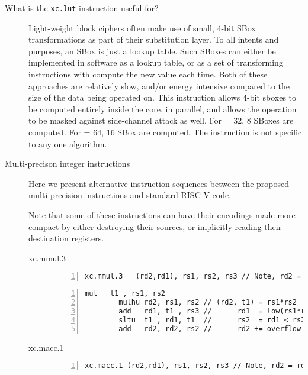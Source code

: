 \begin{description}
\item[What is the {\tt xc.lut} instruction useful for?]
Light-weight block ciphers often make use of small, 4-bit SBox
transformations as part of their substitution layer.
To all intents and purposes, an SBox is just a lookup table.
Such SBoxes can either be implemented in software as a lookup table, or
as a set of transforming instructions with compute the new value each time.
Both of these approaches are relatively slow, and/or energy intensive
compared to the size of the data being operated on.
This instruction allows 4-bit sboxes to be computed entirely
inside the core, in parallel, and allows the operation to be masked against
side-channel attack as well.
For \RVXLEN = 32, 8 SBoxes are computed.
For \RVXLEN = 64, 16 SBox are computed.
The instruction is not specific to any one algorithm.


\item[Multi-precison integer instructions]
\label{sec:design:mpn}

Here we present alternative instruction sequences between the proposed
multi-precision instructions and standard RISC-V code.

Note that some of these instructions can have their encodings
made more compact by either destroying their sources, or
implicitly reading their destination registers.

    \begin{description}

    \item[xc.mmul.3] \hfill

        \begin{lstlisting}[frame=single,title=XCrypto,numbers=left]
        xc.mmul.3   (rd2,rd1), rs1, rs2, rs3 // Note, rd2 = rd1 | 0x1
        \end{lstlisting}

        \begin{lstlisting}[frame=single, title=RISC-V RV32IM / RV64IM,numbers=left]
        mul   t1 , rs1, rs2
        mulhu rd2, rs1, rs2 // (rd2, t1) = rs1*rs2
        add   rd1, t1 , rs3 //      rd1  = low(rs1*rs2)+rs3
        sltu  t1 , rd1, t1  //      rs2  = rd1 < rs2
        add   rd2, rd2, rs2 //      rd2 += overflow bit?
        \end{lstlisting}

    \item[xc.macc.1] \hfill

        \begin{lstlisting}[frame=single,title=XCrypto,numbers=left]
        xc.macc.1 (rd2,rd1), rs1, rs2, rs3 // Note, rd2 = rd1 | 0x1
        \end{lstlisting}


\end{description}
\end{description}
